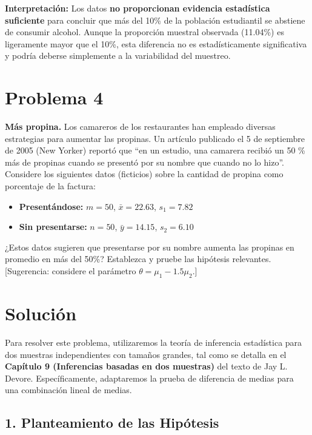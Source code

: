 \documentclass[12pt]{article}
\begin{document}
\textbf{Interpretación:} Los datos \textbf{no proporcionan evidencia estadística suficiente} para concluir que más del 10\% de la población estudiantil se abstiene de consumir alcohol. Aunque la proporción muestral observada (11.04\%) es ligeramente mayor que el 10\%, esta diferencia no es estadísticamente significativa y podría deberse simplemente a la variabilidad del muestreo.


\section*{Problema 4}

\textbf{Más propina.} Los camareros de los restaurantes han empleado diversas estrategias para aumentar las propinas. Un artículo publicado el 5 de septiembre de 2005 (New Yorker) reportó que ``en un estudio, una camarera recibió un 50 \% más de propinas cuando se presentó por su nombre que cuando no lo hizo''. Considere los siguientes datos (ficticios) sobre la cantidad de propina como porcentaje de la factura:

\begin{itemize}
    \item \textbf{Presentándose:} $m = 50$, $\bar{x} = 22.63$, $s_1 = 7.82$
    \item \textbf{Sin presentarse:} $n = 50$, $\bar{y} = 14.15$, $s_2 = 6.10$
\end{itemize}

¿Estos datos sugieren que presentarse por su nombre aumenta las propinas en promedio en más del 50\%? Establezca y pruebe las hipótesis relevantes. [Sugerencia: considere el parámetro $\theta = \mu_1 - 1.5\mu_2$.]

\section*{Solución}

Para resolver este problema, utilizaremos la teoría de inferencia estadística para dos muestras independientes con tamaños grandes, tal como se detalla en el \textbf{Capítulo 9 (Inferencias basadas en dos muestras)} del texto de Jay L. Devore. Específicamente, adaptaremos la prueba de diferencia de medias para una combinación lineal de medias.

\subsection*{1. Planteamiento de las Hipótesis}
\end{document}
